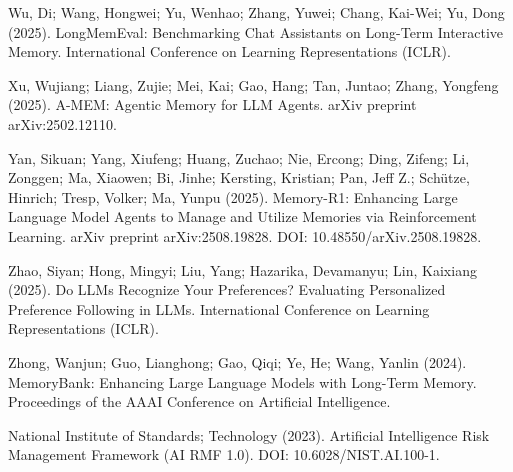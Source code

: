 Wu, Di; Wang, Hongwei; Yu, Wenhao; Zhang, Yuwei; Chang, Kai-Wei; Yu,
Dong (2025). LongMemEval: Benchmarking Chat Assistants on Long-Term
Interactive Memory. International Conference on Learning Representations
(ICLR).

Xu, Wujiang; Liang, Zujie; Mei, Kai; Gao, Hang; Tan, Juntao; Zhang,
Yongfeng (2025). A-MEM: Agentic Memory for LLM Agents. arXiv preprint
arXiv:2502.12110.

Yan, Sikuan; Yang, Xiufeng; Huang, Zuchao; Nie, Ercong; Ding, Zifeng;
Li, Zonggen; Ma, Xiaowen; Bi, Jinhe; Kersting, Kristian; Pan, Jeff Z.;
Schütze, Hinrich; Tresp, Volker; Ma, Yunpu (2025). Memory-R1: Enhancing
Large Language Model Agents to Manage and Utilize Memories via
Reinforcement Learning. arXiv preprint arXiv:2508.19828. DOI:
10.48550/arXiv.2508.19828.

Zhao, Siyan; Hong, Mingyi; Liu, Yang; Hazarika, Devamanyu; Lin, Kaixiang
(2025). Do LLMs Recognize Your Preferences? Evaluating Personalized
Preference Following in LLMs. International Conference on Learning
Representations (ICLR).

Zhong, Wanjun; Guo, Lianghong; Gao, Qiqi; Ye, He; Wang, Yanlin (2024).
MemoryBank: Enhancing Large Language Models with Long-Term Memory.
Proceedings of the AAAI Conference on Artificial Intelligence.

National Institute of Standards; Technology (2023). Artificial
Intelligence Risk Management Framework (AI RMF 1.0). DOI:
10.6028/NIST.AI.100-1.

